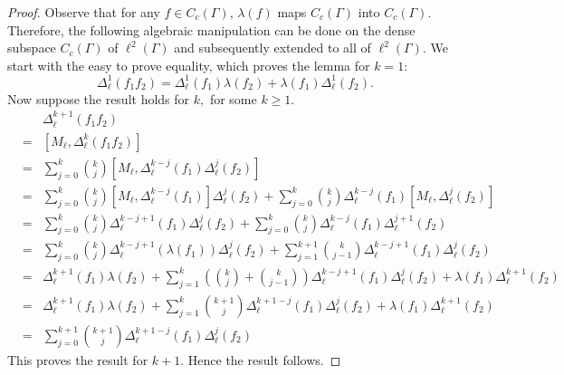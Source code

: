 \documentclass[10pt,a4paper]{amsart}
\newcommand{\Bea}{\begin{eqnarray*}}
\newcommand{\Eea}{\end{eqnarray*}}
\begin{document}
\begin{proof}
Observe that for any $f\in C_{c}(\Gamma)$, $\lambda(f)$ maps $C_{c}(\Gamma)$ into $C_{c}(\Gamma)$. Therefore, the following algebraic manipulation can be done on the dense subspace $C_{c}(\Gamma)$ of $\ell^{2}(\Gamma)$ and subsequently extended to all of $\ell^{2}(\Gamma)$. We start with the easy to prove equality, which proves the lemma for $k=1$: 
\begin{displaymath} 
\Delta_{\ell}^{1} (f_{1}f_{2}) = \Delta_{\ell}^{1} (f_{1}) \lambda(f_{2}) + \lambda(f_{1}) \Delta_{\ell}^{1} (f_{2}).\end{displaymath}
Now suppose the result holds for $k,$ for some $k \geq 1.$  \Bea
&&\Delta_{\ell}^{k + 1} (f_{1}f_{2})\\ & = & \left [M_{\ell}, \Delta_{\ell}^{k} (f_{1}f_{2}) \right ] \\ & = & \sum\limits_{j = 0}^{k} \binom {k} {j} \left [M_{\ell}, \Delta_{\ell}^{k - j} (f_{1}) \Delta_{\ell}^{j} (f_{2}) \right ] \\ & = & \sum\limits_{j = 0}^{k} \binom {k} {j} \left [M_{\ell}, \Delta_{\ell}^{k-j} (f_{1}) \right ] \Delta_{\ell}^{j} (f_{2}) + \sum\limits_{j = 0}^{k} \binom {k} {j} \Delta_{\ell}^{k - j} (f_{1}) \left [M_{\ell}, \Delta_{\ell}^{j} (f_{2}) \right ] \\ & = & \sum\limits_{j = 0}^{k} \binom {k} {j} \Delta_{\ell}^{k-j+1} (f_{1}) \Delta_{\ell}^{j} (f_{2}) + \sum\limits_{j = 0}^{k} \binom {k} {j} \Delta_{\ell}^{k - j} (f_{1}) \Delta_{\ell}^{j+1} (f_{2}) \\ & = & \sum\limits_{j = 0}^{k} \binom {k} {j} \Delta_{\ell}^{k-j+1} (\lambda(f_{1})) \Delta_{\ell}^{j} (f_{2}) + \sum\limits_{j = 1}^{k + 1} \binom {k} {j - 1} \Delta_{\ell}^{k - j + 1} (f_{1}) \Delta_{\ell}^{j} (f_{2}) \\ & = & \Delta_{\ell}^{k + 1} (f_{1}) \lambda(f_{2}) + \sum\limits_{j = 1}^{k} \left (\binom {k} {j} + \binom {k} {j - 1} \right ) \Delta_{\ell}^{k - j + 1} (f_{1}) \Delta_{\ell}^{j} (f_{2}) + \lambda(f_{1}) \Delta_{\ell}^{k + 1} (f_{2}) \\ & = & \Delta_{\ell}^{k + 1} (f_{1}) \lambda(f_{2}) + \sum\limits_{j = 1}^{k} \binom {k + 1} {j} \Delta_{\ell}^{k + 1 - j} (f_{1}) \Delta_{\ell}^{j} (f_{2}) + \lambda(f_{1}) \Delta_{\ell}^{k + 1} (f_{2}) \\ & = & \sum\limits_{j = 0}^{k + 1} \binom {k + 1} {j} \Delta_{\ell}^{k + 1 - j} (f_{1}) \Delta_{\ell}^{j} (f_{2})
\Eea
This proves the result for $k + 1.$ Hence the result follows.\end{proof}
\end{document}
